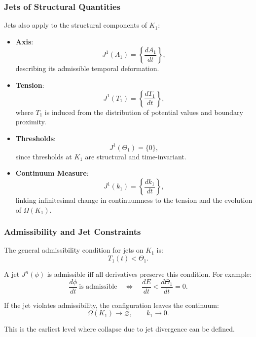 \subsubsection{Jets of Structural Quantities}

Jets also apply to the structural components of $K_1$:

\begin{itemize}
    \item \textbf{Axis}:
    \[
    J^1(A_1) = \left\{\frac{dA_1}{dt}\right\},
    \]
    describing its admissible temporal deformation.
    
    \item \textbf{Tension}:
    \[
    J^1(T_1) = \left\{\frac{dT_1}{dt}\right\},
    \]
    where $T_1$ is induced from the distribution of potential values and
    boundary proximity.

    \item \textbf{Thresholds}:
    \[
    J^1(\Theta_1)=\{0\},
    \]
    since thresholds at $K_1$ are structural and time-invariant.

    \item \textbf{Continuum Measure}:
    \[
    J^1(k_1) = \left\{ \frac{dk_1}{dt} \right\},
    \]
    linking infinitesimal change in continuumness to the tension and the
    evolution of $\Omega(K_1)$.
\end{itemize}



\subsubsection{Admissibility and Jet Constraints}

The general admissibility condition for jets on $K_1$ is:
\[
T_1(t) < \Theta_1.
\]

A jet $J^n(\phi)$ is admissible iff all derivatives preserve this
condition. For example:
\[
\frac{d\phi}{dt} \ \text{is admissible}
\quad\Longleftrightarrow\quad
\frac{dE}{dt} < \frac{d\Theta_1}{dt} = 0.
\]

If the jet violates admissibility, the configuration leaves the
continuum:
\[
\Omega(K_1) \to \varnothing,
\qquad
k_1 \to 0.
\]

This is the earliest level where collapse due to jet divergence can be
defined.



